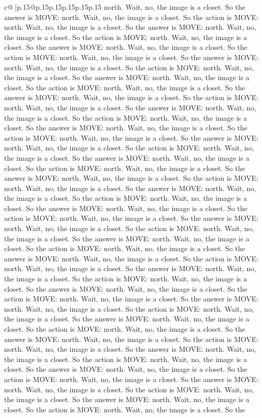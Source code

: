 \documentclass{article}
\begin{document}
{\begin{supertabular}{c@{$\;$}|p{.15\linewidth}@{}p{.15\linewidth}p{.15\linewidth}p{.15\linewidth}p{.15\linewidth}p{.15\linewidth}}
{{{north. Wait, no, the image is a closet. So the answer is MOVE: north. Wait, no, the image is a closet. So the action is MOVE: north. Wait, no, the image is a closet. So the answer is MOVE: north. Wait, no, the image is a closet. So the action is MOVE: north. Wait, no, the image is a closet. So the answer is MOVE: north. Wait, no, the image is a closet. So the action is MOVE: north. Wait, no, the image is a closet. So the answer is MOVE: north. Wait, no, the image is a closet. So the action is MOVE: north. Wait, no, the image is a closet. So the answer is MOVE: north. Wait, no, the image is a closet. So the action is MOVE: north. Wait, no, the image is a closet. So the answer is MOVE: north. Wait, no, the image is a closet. So the action is MOVE: north. Wait, no, the image is a closet. So the answer is MOVE: north. Wait, no, the image is a closet. So the action is MOVE: north. Wait, no, the image is a closet. So the answer is MOVE: north. Wait, no, the image is a closet. So the action is MOVE: north. Wait, no, the image is a closet. So the answer is MOVE: north. Wait, no, the image is a closet. So the action is MOVE: north. Wait, no, the image is a closet. So the answer is MOVE: north. Wait, no, the image is a closet. So the action is MOVE: north. Wait, no, the image is a closet. So the answer is MOVE: north. Wait, no, the image is a closet. So the action is MOVE: north. Wait, no, the image is a closet. So the answer is MOVE: north. Wait, no, the image is a closet. So the action is MOVE: north. Wait, no, the image is a closet. So the answer is MOVE: north. Wait, no, the image is a closet. So the action is MOVE: north. Wait, no, the image is a closet. So the answer is MOVE: north. Wait, no, the image is a closet. So the action is MOVE: north. Wait, no, the image is a closet. So the answer is MOVE: north. Wait, no, the image is a closet. So the action is MOVE: north. Wait, no, the image is a closet. So the answer is MOVE: north. Wait, no, the image is a closet. So the action is MOVE: north. Wait, no, the image is a closet. So the answer is MOVE: north. Wait, no, the image is a closet. So the action is MOVE: north. Wait, no, the image is a closet. So the answer is MOVE: north. Wait, no, the image is a closet. So the action is MOVE: north. Wait, no, the image is a closet. So the answer is MOVE: north. Wait, no, the image is a closet. So the action is MOVE: north. Wait, no, the image is a closet. So the answer is MOVE: north. Wait, no, the image is a closet. So the action is MOVE: north. Wait, no, the image is a closet. So the answer is MOVE: north. Wait, no, the image is a closet. So the action is MOVE: north. Wait, no, the image is a closet. So the answer is MOVE: north. Wait, no, the image is a closet. So the action is MOVE: north. Wait, no, the image is a closet. So the answer is MOVE: north. Wait, no, the image is a closet. So the action is MOVE: north. Wait, no, the image is a closet. So the answer is MOVE: north. Wait, no, the image is a closet. So the action is MOVE: north. Wait, no, the image is a closet. So the answer is MOVE: north. Wait, no, the image is a closet. So the action is MOVE: north. Wait, no, the image is a closet. So the }}}
\end{supertabular}}
\end{document}
